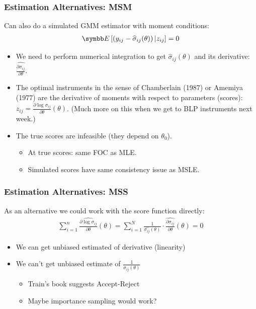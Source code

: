 \documentclass[aspectratio=169,11pt]{beamer}
\begin{document}
\begin{frame}
\frametitle{Estimation Alternatives: MSM}
Can also do a simulated GMM estimator with moment conditions:
\begin{align*}
\E\left[\left(y_{ij} - \widehat{\sigma}_{ij}(\theta) \right) | z_{ij} \right]=0
\end{align*}
\begin{itemize}
\item We need to perform numerical integration to get $\widehat{\sigma}_{ij}(\theta)$ and its derivative: $\widehat{\frac{\partial \sigma_{ij}}{\partial \theta}}$.
\item The \alert{optimal instruments} in the sense of Chamberlain (1987) or Amemiya (1977) are the derivative of moments with respect to parameters (\alert{scores}): $z_{ij} = \frac{\partial \log \sigma_{ij}}{\partial \theta}(\theta)$. (Much more on this when we get to BLP instruments next week.)
\item The true scores are infeasible (they depend on $\theta_0$).
\begin{itemize}
\item At true scores: same FOC as MLE.
\item Simulated scores have same consistency issue as MSLE.
\end{itemize}
\end{itemize}
\end{frame}


\begin{frame}
\frametitle{Estimation Alternatives: MSS}
As an alternative we could work with the score function directly:
\begin{align*}
\sum_{i=1}^n\widehat { \frac{\partial \log \sigma_{ij}}{\partial \theta}}(\theta) =\sum_{i=1}^N \frac{1}{\widehat{\sigma_{ij}}(\theta)} \cdot  \widehat{\frac{\partial \sigma_{ij}}{\partial \theta}}(\theta) = 0
\end{align*}
\begin{itemize}
\item We can get unbiased estimated of derivative (linearity)
\item We can't get unbiased estimate of $\frac{1}{\widehat{\sigma_{ij}}(\theta)}$
\begin{itemize}
\item Train's book suggests Accept-Reject 
\item Maybe importance sampling would work?
\end{itemize}
\end{itemize}
\end{frame}
\end{document}
